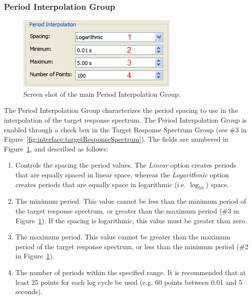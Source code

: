 \documentclass[11pt]{article}
\begin{document}
\FloatBarrier
\subsubsection{Period Interpolation Group}
\label{sec:interface:periodInterpolation}

\begin{figure}[h]
  \begin{center}
	\includegraphics[scale=0.7]{screenshots/periodInterpolation}
  \end{center}
  \caption{Screen shot of the main Period Interpolation Group.}
  \label{fig:interface:periodInterpolation}
\end{figure}

The Period Interpolation Group characterizes the period spacing to use
in the interpolation of the target response spectrum. The Period
Interpolation Group is enabled through a check box in the Target
Response Spectrum Group (see \#3 in
Figure~\ref{fig:interface:targetResponseSpectrum}). The fields are numbered in
Figure~\ref{fig:interface:periodInterpolation}, and described as follows:
\begin{enumerate}
  \item Controls the spacing the period values. The \emph{Linear} option creates
	periods that are equally spaced in linear space, whereas the
	\emph{Logarithmic} option creates periods that are equally space in
	logarithmic (i.e.  $\log_{10}$) space.
  \item The minimum period. This value cannot be less than the minimum period of
	the target response spectrum, or greater than the maximum period (\#3 in
	Figure~\ref{fig:interface:periodInterpolation}). If the spacing is
	logarithmic, this value must be greater than zero.
  \item The maximum period. This value cannot be greater than the maximum
	period of the target response spectrum, or less than the minimum period (\#2
	in Figure~\ref{fig:interface:periodInterpolation}).
  \item The number of periods within the specified range. It is recommended that
	at least 25 points for each log cycle be used (e.g. 60 points between 0.01
	and 5 seconds).
\end{enumerate}
\end{document}
